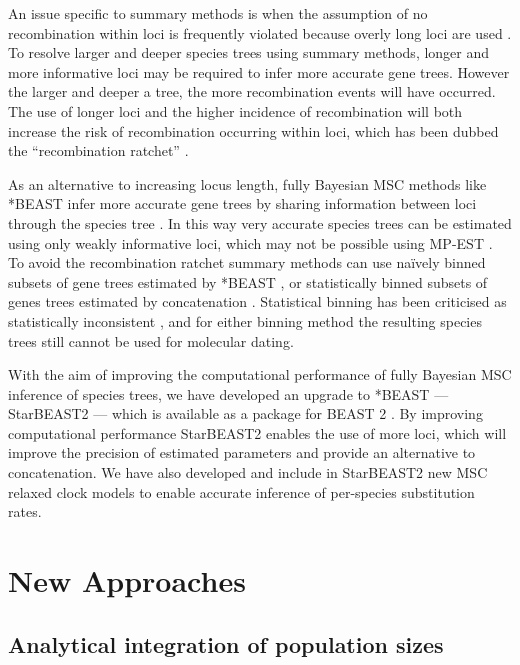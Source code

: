 \documentclass[12pt]{article}
\begin{document}
An issue specific to summary methods is when the assumption of
no recombination within loci is frequently violated because overly long loci are used \citep{Gatesy26032013}. To
resolve larger and deeper species trees using summary methods, longer and more
informative loci may be required to infer more accurate gene trees. However
the larger and deeper a tree, the more recombination events will have occurred.
The use of longer loci and the higher incidence of recombination will both
increase the risk of recombination occurring within loci, which has been dubbed
the ``recombination ratchet'' \citep{Springer20161}.

As an alternative to increasing locus length, fully Bayesian MSC methods like
*BEAST infer more accurate gene trees by sharing information between loci
through the species tree \citep{Szollosi01012015}. In this way very accurate
species trees can be estimated using only weakly informative loci, which may
not be possible using MP-EST \citep{Xu1353}. To avoid the recombination
ratchet summary methods can use na\"ively binned subsets of gene trees
estimated by *BEAST \citep{Zimmermann2014}, or statistically binned subsets of
genes trees estimated by concatenation \citep{Mirarab1250463}. Statistical
binning has been criticised as statistically inconsistent
\citep{Liu171}, and for either binning method the resulting species trees
still cannot be used for molecular dating.

With the aim of improving the computational performance of fully Bayesian MSC
inference of species trees, we have developed an upgrade to *BEAST ---
StarBEAST2 --- which is available as a package for BEAST 2
\citep{10.1371/journal.pcbi.1003537}. By improving computational performance
StarBEAST2 enables the use of more loci, which will improve the
precision of estimated parameters and provide an alternative to concatenation.
We have also developed and include in StarBEAST2 new MSC relaxed clock models
to enable accurate inference of per-species substitution rates.

\section{New Approaches}

\subsection{Analytical integration of population sizes}
\end{document}

